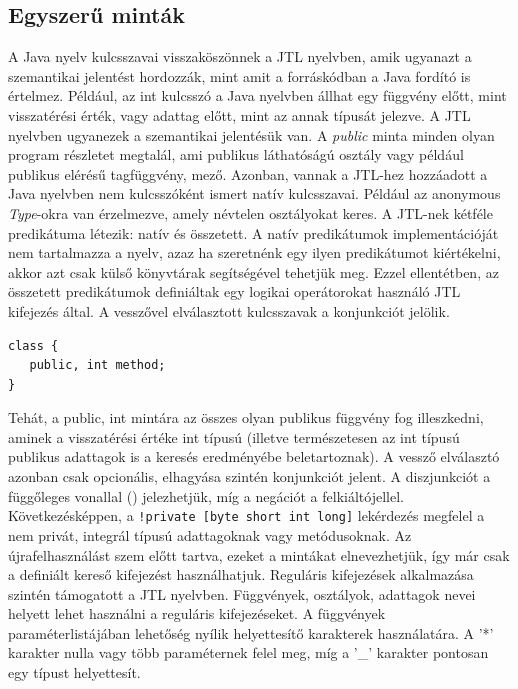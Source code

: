 \documentclass[a4paper,12pt]{report}
\begin{document}
\subsection{Egyszerű minták}
\par A Java nyelv kulcsszavai visszaköszönnek a JTL nyelvben, amik ugyanazt a szemantikai jelentést hordozzák, mint amit a forráskódban a Java fordító is értelmez. Például, az int kulcsszó a Java nyelvben állhat egy függvény előtt, mint visszatérési érték, vagy adattag előtt, mint az annak típusát jelezve. A JTL nyelvben ugyanezek a szemantikai jelentésük van. A \textit{public} minta minden olyan program részletet megtalál, ami publikus láthatóságú osztály vagy például publikus elérésű tagfüggvény, mező. Azonban, vannak a JTL-hez hozzáadott a Java nyelvben nem kulcsszóként ismert natív kulcsszavai. Például az anonymous \textit{Type}-okra van érzelmezve, amely névtelen osztályokat keres. A JTL-nek kétféle predikátuma létezik: natív és összetett. A natív predikátumok implementációját nem tartalmazza a nyelv, azaz ha szeretnénk egy ilyen predikátumot kiértékelni, akkor azt csak külső könyvtárak segítségével tehetjük meg. Ezzel ellentétben, az összetett predikátumok definiáltak egy logikai operátorokat használó JTL kifejezés által. A vesszővel elválasztott kulcsszavak a konjunkciót jelölik. 
\begin{verbatim}
class {
   public, int method;
}
\end{verbatim}
Tehát, a public, int mintára az összes olyan publikus függvény fog illeszkedni, aminek a visszatérési értéke int típusú (illetve természetesen az int típusú publikus adattagok is a keresés eredményébe beletartoznak). A vessző elválasztó azonban csak opcionális, elhagyása szintén konjunkciót jelent. A diszjunkciót a függőleges vonallal (\textpipe) jelezhetjük, míg a negációt a felkiáltójellel. Következésképpen, a \texttt{!private [byte \textpipe{} short \textpipe{} int \textpipe{} long]} lekérdezés megfelel a nem privát, integrál típusú adattagoknak vagy metódusoknak. Az újrafelhasználást szem előtt tartva, ezeket a mintákat elnevezhetjük, így már csak a definiált kereső kifejezést használhatjuk. Reguláris kifejezések alkalmazása szintén támogatott a JTL nyelvben. Függvények, osztályok, adattagok nevei helyett lehet használni a reguláris kifejezéseket. A függvények paraméterlistájában lehetőség nyílik helyettesítő karakterek használatára. A ’*’ karakter nulla vagy több paraméternek felel meg, míg a ’\_’ karakter pontosan egy típust helyettesít.
\end{document}
